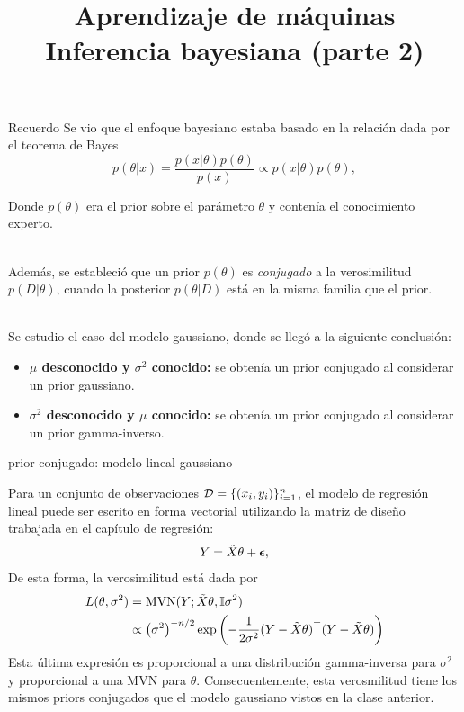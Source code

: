 \documentclass[9pt]{beamer}
\title{\textbf{Aprendizaje de máquinas} \\ Inferencia bayesiana (parte 2)}
\begin{document}
\begin{frame}
  \titlepage
\end{frame}

\begin{frame}{Recuerdo}
Se vio que el enfoque bayesiano estaba basado en la relación dada por el teorema de Bayes
	\begin{equation*}
	p(\theta|x) = \frac{p(x|\theta)p(\theta)}{p(x)} \propto p(x|\theta)p(\theta),\label{eq:Bayes}
\end{equation*}

Donde $p(\theta)$ era el prior sobre el parámetro $\theta$ y contenía el conocimiento experto.\\~\ \pause

Además, se estableció que un prior $p(\theta)$ es \emph{conjugado} a la verosimilitud $p(D|\theta)$, cuando la posterior $p(\theta|D)$ está en la misma familia que el prior.\\~\ \pause

Se estudio el caso del modelo gaussiano, donde se llegó a la siguiente conclusión:

\begin{itemize}
	\item \textbf{$\mu$ desconocido y $\sigma^2$ conocido:} se obtenía un prior conjugado al considerar un prior gaussiano.
	\item \textbf{$\sigma^2$ desconocido y $\mu$ conocido:} se obtenía un prior conjugado al considerar un prior gamma-inverso. 
\end{itemize}

\end{frame}

\begin{frame}{prior conjugado: modelo lineal gaussiano}

Para un conjunto de observaciones ${\mathcal D}=\{(x_i,y_i)\}_{i=1}^n$, el modelo de regresión lineal puede ser escrito en forma vectorial utilizando la matriz de diseño trabajada en el capítulo de regresión:
\begin{equation*}
 	Y = \tilde{X}\theta + {\bm \epsilon},
 \end{equation*} \pause
De esta forma, la verosimilitud está dada por 
\begin{align*}
	L(\theta,\sigma^2) &= \operatorname{\text{MVN}}(Y; \tilde{X}\theta, {\mathbb I}\sigma^2)\\
					&\propto \left(\sigma^2\right)^{-n/2}   \exp\left(-\frac{1}{2\sigma^2} (Y - \tilde{X}\theta)^\top(Y - \tilde{X}\theta)\right)\nonumber
\end{align*} \pause
Esta última  expresión es proporcional a una distribución gamma-inversa para $\sigma^2$ y proporcional a una MVN para $\theta$. Consecuentemente, esta verosmilitud tiene los mismos priors conjugados que el modelo gaussiano vistos en la clase anterior. 
	
\end{frame}
\end{document}
